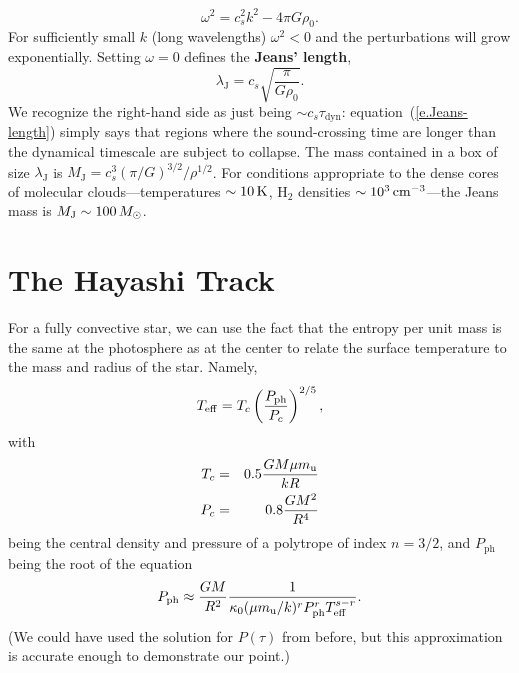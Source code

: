 \begin{equation}\label{e.jeans-dispersion}
\omega^{2} = c_{s}^{2}k^{2} - 4\pi G\rho_{0}.
\end{equation}
For sufficiently small $k$ (long wavelengths) $\omega^{2}<0$ and the perturbations will grow exponentially. Setting $\omega = 0$ defines the \textbf{Jeans' length},
\begin{equation}\label{e.Jeans-length}
\lambda_{\mathrm{J}} = c_{s}\sqrt{\frac{\pi}{G\rho_{0}}}.
\end{equation}
We recognize the right-hand side as just being $\sim c_{s} \tau_{\mathrm{dyn}}$: equation~(\ref{e.Jeans-length}) simply says that regions where the sound-crossing time are longer than the dynamical timescale are subject to collapse.  The mass contained in a box of size $\lambda_{\mathrm{J}}$ is $M_{\mathrm{J}} = c_{s}^{3}(\pi/G)^{3/2}/\rho^{1/2}$.  For conditions appropriate to the dense cores of molecular clouds---temperatures $\sim 10\,\mathrm{K}$, $\mathrm{H}_{2}$ densities $\sim 10^{3}\,\mathrm{c}\mathrm{m}^{-3}$---the Jeans mass is $M_{\mathrm{J}} \sim 100\,M_\odot$.

\section{The Hayashi Track}\label{s.Hayashi}

For a fully convective star, we can use the fact that the entropy per unit mass is the same at the photosphere as at the center to relate the surface temperature to the mass and radius of the star. Namely,
\begin{equation}\label{e.Teff-adiabat}
T_{\mathrm{eff}} = T_{c}\left(\frac{P_{\mathrm{ph}}}{P_{c}}\right)^{2/5},
\end{equation}
with
\begin{eqnarray}
T_{c} &=& 0.5 \frac{GM\mu m_\mathrm{u}}{kR} \label{e.fc-Tc}\\
P_{c} &=& 0.8\frac{GM^{2}}{R^{4}} \label{e.fc-Pc}
\end{eqnarray}
being the central density and pressure of a polytrope of index $n=3/2$, and $P_{\mathrm{ph}}$ being the root of the equation
\begin{equation}\label{e.pph}
 P_{\mathrm{ph}} \approx \frac{GM}{R^{2}}\frac{1}{\kappa_{0}(\mu m_\mathrm{u}/k)^{r}P_{\mathrm{ph}}^{r}T_{\mathrm{eff}}^{s-r}}. 
\end{equation}
(We could have used the solution for $P(\tau)$ from before, but this approximation is accurate enough to demonstrate our point.)

